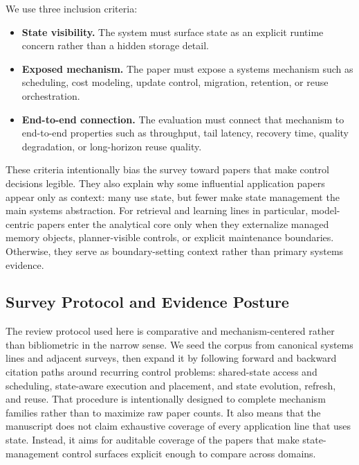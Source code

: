 \documentclass[acmsmall,screen,review]{acmart}
\begin{document}
We use three inclusion criteria:
\begin{itemize}[leftmargin=*]
\item \textbf{State visibility.} The system must surface state as an explicit runtime concern rather than a hidden storage detail.
\item \textbf{Exposed mechanism.} The paper must expose a systems mechanism such as scheduling, cost modeling, update control, migration, retention, or reuse orchestration.
\item \textbf{End-to-end connection.} The evaluation must connect that mechanism to end-to-end properties such as throughput, tail latency, recovery time, quality degradation, or long-horizon reuse quality.
\end{itemize}
These criteria intentionally bias the survey toward papers that make control decisions legible. They also explain why some influential application papers appear only as context: many use state, but fewer make state management the main systems abstraction. For retrieval and learning lines in particular, model-centric papers enter the analytical core only when they externalize managed memory objects, planner-visible controls, or explicit maintenance boundaries. Otherwise, they serve as boundary-setting context rather than primary systems evidence.

\subsection{Survey Protocol and Evidence Posture}

The review protocol used here is comparative and mechanism-centered rather than bibliometric in the narrow sense. We seed the corpus from canonical systems lines and adjacent surveys, then expand it by following forward and backward citation paths around recurring control problems: shared-state access and scheduling, state-aware execution and placement, and state evolution, refresh, and reuse. That procedure is intentionally designed to complete mechanism families rather than to maximize raw paper counts. It also means that the manuscript does not claim exhaustive coverage of every application line that uses state. Instead, it aims for auditable coverage of the papers that make state-management control surfaces explicit enough to compare across domains.
\end{document}
